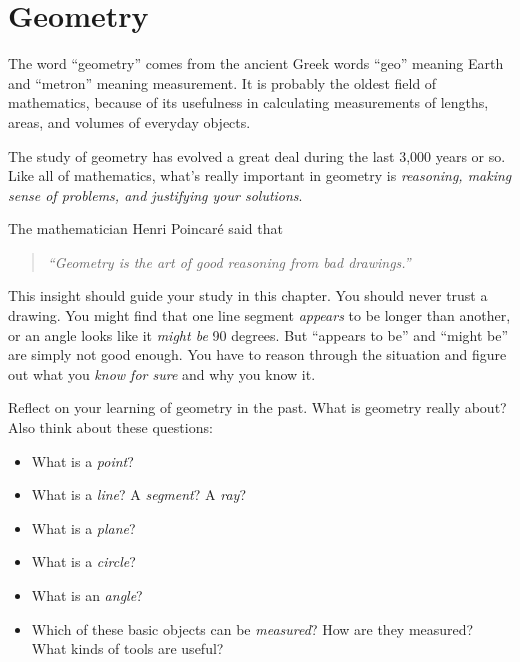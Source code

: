 
\chapter{Geometry}


The word ``geometry'' comes from the ancient Greek words ``geo'' meaning Earth and ``metron'' meaning measurement.  It is probably the oldest field of mathematics, because of its usefulness in calculating  measurements of lengths, areas, and volumes of everyday objects.


The study of geometry has evolved a great deal during the last 3,000 years or so.  Like all of mathematics, what's really important in geometry  is \emph{reasoning, making sense of problems, and justifying your solutions}.  

The mathematician Henri Poincar\'e said that 
\begin{quote}
\emph{``Geometry is the art of good reasoning from bad drawings.'' }
\end{quote}
 This insight should guide your study in this chapter.  You should never trust a drawing.  You might find that one line segment \emph{appears} to be longer than another, or an angle looks like it \emph{might be} 90 degrees.  But ``appears to be'' and ``might be'' are simply not good enough.  You have to reason through the situation and figure out what you \emph{know for sure} and why you know it.




\bigskip
\bigskip

 \begin{thinkpair*}
 Reflect on your learning of geometry in the past. What is geometry really about?   Also think about these questions:
 
 \bigskip
 
 
\begin{itemize}
\item
What is a \emph{point}?\\

\item
What is a \emph{line}? A \emph{segment}? A \emph{ray}? \\

\item
What is a \emph{plane}?\\

\item
What is a \emph{circle}? \\

\item
What is an \emph{angle}? \\

\item
Which of these basic objects can be \emph{measured}?  How are they measured?  What kinds of tools are useful?
\end{itemize}
\end{thinkpair*}

